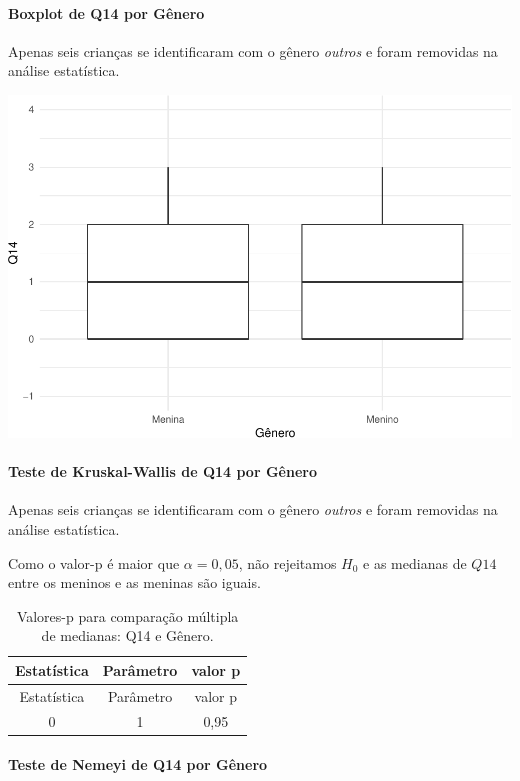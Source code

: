 \documentclass[]{article}
\let\oldparagraph\paragraph
\renewcommand{\paragraph}[1]{\oldparagraph{#1}\mbox{}}
\begin{document}
\hypertarget{boxplot-de-q14-por-guxeanero}{%
\paragraph{Boxplot de Q14 por Gênero}\label{boxplot-de-q14-por-guxeanero}}

Apenas seis crianças se identificaram com o gênero \emph{outros} e foram removidas na análise estatística.

\begin{center}\includegraphics[width=0.75\linewidth]{relatorio_files/figure-latex/unnamed-chunk-71-1} \end{center}

\hypertarget{teste-de-kruskal-wallis-de-q14-por-guxeanero}{%
\paragraph{Teste de Kruskal-Wallis de Q14 por Gênero}\label{teste-de-kruskal-wallis-de-q14-por-guxeanero}}

Apenas seis crianças se identificaram com o gênero \emph{outros} e foram removidas na análise estatística.

Como o valor-p é maior que \(\alpha=0,05\), não rejeitamos \(H_0\) e as medianas de \(Q14\) entre os meninos e as meninas são iguais.

\begin{longtable}[]{@{}ccc@{}}
\caption{\label{tab:unnamed-chunk-72}Valores-p para comparação múltipla de medianas: Q14 e Gênero.}\tabularnewline
\toprule
Estatística & Parâmetro & valor p\tabularnewline
\midrule
\endfirsthead
\toprule
Estatística & Parâmetro & valor p\tabularnewline
\midrule
\endhead
0 & 1 & 0,95\tabularnewline
\bottomrule
\end{longtable}

\hypertarget{teste-de-nemeyi-de-q14-por-guxeanero}{%
\paragraph{Teste de Nemeyi de Q14 por Gênero}\label{teste-de-nemeyi-de-q14-por-guxeanero}}
\end{document}
